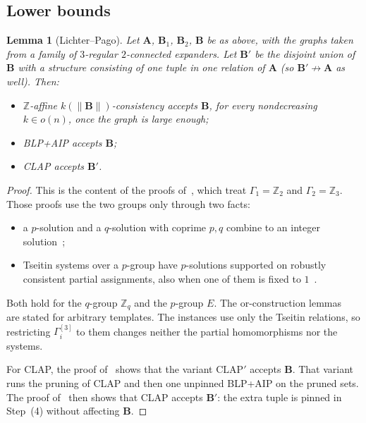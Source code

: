 \documentclass[11pt]{article}
\newtheorem{lemma}[theorem]{Lemma}
\theoremstyle{definition}
\theoremstyle{remark}
\newcommand{\size}[1]{\lVert #1\rVert}
\newcommand{\Z}{\mathbb Z}
\begin{document}
\subsection{Lower bounds}

\begin{lemma}[Lichter--Pago]\label{lem:LPgen}
Let $\mathbf A$, $\mathbf B_1$, $\mathbf B_2$, $\mathbf B$ be as above, with the
graphs taken from a family of $3$-regular $2$-connected expanders. Let $\mathbf
B'$ be the disjoint union of $\mathbf B$ with a structure consisting of one tuple
in one relation of $\mathbf A$ (so $\mathbf B'\not\to\mathbf A$ as well). Then:
\begin{itemize}
\item $\Z$-affine $k(\size{\mathbf B})$-consistency accepts $\mathbf B$, for
every nondecreasing $k\in o(n)$, once the graph is large enough;
\item BLP+AIP accepts $\mathbf B$;
\item CLAP accepts $\mathbf B'$.
\end{itemize}
\end{lemma}
\begin{proof}
This is the content of the proofs of~\cite[Thms.~5.2, 5.5, 5.7]{LP25}, which
treat $\Gamma_1=\Z_2$ and $\Gamma_2=\Z_3$. Those proofs use the two groups only
through two facts:
\begin{itemize}
\item a $p$-solution and a $q$-solution with coprime $p,q$ combine to an integer
solution~\cite[Lemma~2.2]{LP25};
\item Tseitin systems over a $p$-group have $p$-solutions supported on robustly
consistent partial assignments, also when one of them is fixed to
$1$~\cite[Lemma~4.10, Cor.~4.13]{LP25}.
\end{itemize}
Both hold for the $q$-group $\Z_q$ and the $p$-group $E$. The or-construction
lemmas~\cite[Lemmas~3.6--3.9]{LP25} are stated for arbitrary templates. The
instances use only the Tseitin relations, so restricting $\Gamma_i^{[3]}$ to them
changes neither the partial homomorphisms nor the systems.

For CLAP, the proof of~\cite[Thm.~5.7]{LP25} shows that the variant
$\mathrm{CLAP}'$ accepts $\mathbf B$. That variant runs the pruning of CLAP and
then one unpinned BLP+AIP on the pruned sets. The proof of~\cite[Lemma~5.6]{LP25}
then shows that CLAP accepts $\mathbf B'$: the extra tuple is pinned in Step~(4)
without affecting $\mathbf B$.
\end{proof}
\end{document}
